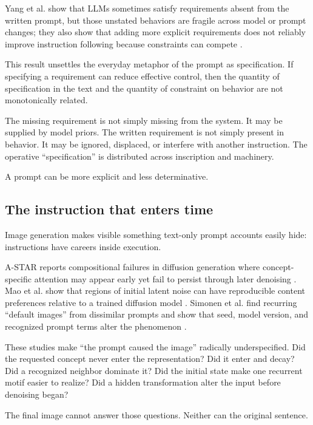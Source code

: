 \documentclass[11pt]{article}
\begin{document}
Yang et al. show that LLMs sometimes satisfy requirements absent from the written prompt, but those unstated behaviors are fragile across model or prompt changes; they also show that adding more explicit requirements does not reliably improve instruction following because constraints can compete \citep{Yang2025PromptsDontSay}.

This result unsettles the everyday metaphor of the prompt as specification. If specifying a requirement can reduce effective control, then the quantity of specification in the text and the quantity of constraint on behavior are not monotonically related.

The missing requirement is not simply missing from the system. It may be supplied by model priors. The written requirement is not simply present in behavior. It may be ignored, displaced, or interfere with another instruction. The operative ``specification'' is distributed across inscription and machinery.

A prompt can be more explicit and less determinative.

\subsection{The instruction that enters time}

Image generation makes visible something text-only prompt accounts easily hide: instructions have careers inside execution.

A-STAR reports compositional failures in diffusion generation where concept-specific attention may appear early yet fail to persist through later denoising \citep{Agarwal2023ASTAR}. Mao et al. show that regions of initial latent noise can have reproducible content preferences relative to a trained diffusion model \citep{Mao2023InitialImageEditing}. Simonen et al. find recurring ``default images'' from dissimilar prompts and show that seed, model version, and recognized prompt terms alter the phenomenon \citep{Simonen2026DefaultImages}.

These studies make ``the prompt caused the image'' radically underspecified. Did the requested concept never enter the representation? Did it enter and decay? Did a recognized neighbor dominate it? Did the initial state make one recurrent motif easier to realize? Did a hidden transformation alter the input before denoising began?

The final image cannot answer those questions. Neither can the original sentence.
\end{document}
